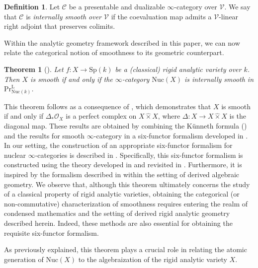 \documentclass[oneside, hidelinks, 12pt, a4paper,reqno]{amsart}
\theoremstyle{plain}
\newtheorem{theorem}{Theorem}[section]
\theoremstyle{definition}
\newtheorem{definition}[definition]{Definition}
\theoremstyle{plain}
\newcommand{\rL}{\mathrm L}
\newcommand{\cC}{\mathscr C}
\newcommand{\cV}{\mathscr V}
\newcommand{\Sp}{\mathrm{Sp}}
\newcommand{\cat}{$\infty$-category }
\newcommand{\cates}{$\infty$-categories }
\newcommand{\LPr}{\mathrm{Pr}^\rL}
\newcommand{\Nuc}{\mathrm{Nuc}}
\begin{document}
\begin{definition}
    Let $\cC$ be a presentable and dualizable \cat over $\cV$. We say that $\cC$ is \emph{internally smooth over $\cV$} if the coevaluation map admits a $\mathscr{V}$-linear right adjoint that preserves colimits.
\end{definition}

Within the analytic geometry framework described in this paper, we can now relate the categorical notion of smoothness to its geometric counterpart.

\begin{theorem}[]\label{thm: main theomre smoothness intro}
    Let $f \colon X \to \Sp(k)$ be a (classical) rigid analytic variety over $k$. Then $X$ is smooth if and only if the \cat $\Nuc(X)$ is internally smooth in $\LPr_{\Nuc(k)}$.
\end{theorem}

This theorem follows as a consequence of , which demonstrates that $X$ is smooth if and only if $\Delta_\ast \mathscr{O}_X$ is a perfect complex on $X\widehat{\times}X$, where $\Delta \colon X \to X\widehat{\times}X$ is the diagonal map. These results are obtained by combining the K\"unneth formula () and the results for smooth \cat in a six-functor formalism developed in . In our setting, the construction of an appropriate six-functor formalism for nuclear \cates is described in . Specifically, this six-functor formalism is constructed using the theory developed in \cite{mann2022padic6functorformalismrigidanalytic} and revisited in \cite{heyer20246functorformalismssmoothrepresentations}. Furthermore, it is inspired by the formalism described in \cite[Lecture 8]{scholze2025sixfunctorformalisms} within the setting of derived algebraic geometry. We observe that, although this theorem ultimately concerns the study of a classical property of rigid analytic varieties, obtaining the categorical (or non-commutative) characterization of smoothness requires entering the realm of condensed mathematics and the setting of derived rigid analytic geometry described herein. Indeed, these methods are also essential for obtaining the requisite six-functor formalism.

As previously explained, this theorem plays a crucial role in relating the atomic generation of $\Nuc(X)$ to the algebraization of the rigid analytic variety $X$.
\end{document}
